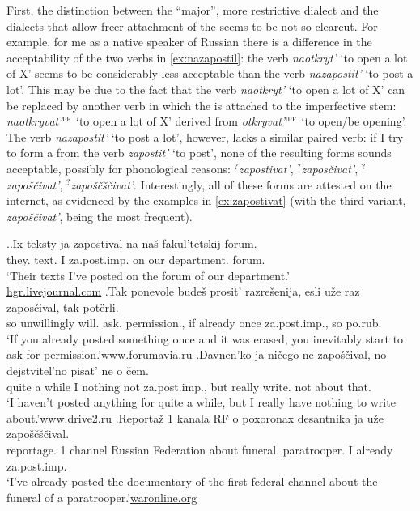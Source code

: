 First, the distinction between the ``major'', more restrictive dialect and the dialects that allow freer attachment of the   seems to be not so clearcut. For example, for me as a native speaker of Russian there is a difference in the acceptability of the two verbs in \ref{ex:nazapostil}: the verb \textit{naotkryt'} `to open a lot of X' seems to be considerably less acceptable than the verb \textit{nazapostit'} `to post a lot'. This may be due to the fact that the verb \textit{naotkryt'} `to open a lot of X' can be replaced by another verb in which the   is attached to the imperfective stem: \textit{naotkryvat'}$^{\textsc{pf}}$ `to open a lot of X' derived from \textit{otkryvat'}$^{\textsc{ipf}}$ `to open/be opening'. The verb \textit{nazapostit'} `to post a lot', however, lacks a similar paired verb: if I try to form a  from the verb \textit{zapostit'} `to post', none of the resulting forms sounds acceptable, possibly for phonological reasons: $^?$\textit{zapostivat'}, $^?$\textit{zapos\v{c}ivat'}, $^?$\textit{zapo\v{s}\v{c}ivat'}, $^?$\textit{zapo\v{s}\v{c}\v{s}\v{c}ivat'}. Interestingly, all of these forms are attested on the internet, as evidenced by the examples in \ref{ex:zapostivat} (with the third variant, \textit{zapo\v{s}\v{c}ivat'}, being the most frequent).

\ex.\label{ex:zapostivat}\ag.Ix teksty ja zapostival na na\v{s} fakul'tetskij forum.\\
they. text. I za.post.imp. on our department. forum.\\
\trans `Their texts I've posted on the forum of our department.'\\\hbox{}\hfill\hbox{\url{hgr.livejournal.com}}
\bg.Tak ponevole bude\v{s} prosit' razre\v{s}enija, esli u\v{z}e raz zapos\v{c}ival, tak pot\"{e}rli.\\
so unwillingly will. ask. permission., if already once za.post.imp., so po.rub.\\
\trans `If you already posted something once and it was erased, you inevitably start to ask for permission.'\hbox{}\hfill\hbox{\url{www.forumavia.ru}}
\bg.Davnen'ko ja ni\v{c}ego ne zapo\v{s}\v{c}ival, no dejstvitel'no pisat' ne o \v{c}em.\\
{quite a while} I nothing not za.post.imp., but really write. not about that.\\
\trans `I haven't posted anything for quite a while, but I really have nothing to write about.'\hbox{}\hfill\hbox{\url{www.drive2.ru}}
\bg.Reporta\v{z} 1 kanala RF o poxoronax desantnika ja u\v{z}e zapo\v{s}\v{c}\v{s}\v{c}ival.\\
reportage. 1 channel {Russian Federation} about funeral. paratrooper. I already za.post.imp.\\
\trans `I've already posted the documentary of the first federal channel about the funeral of a paratrooper.'\hbox{}\hfill\hbox{\url{waronline.org}}

